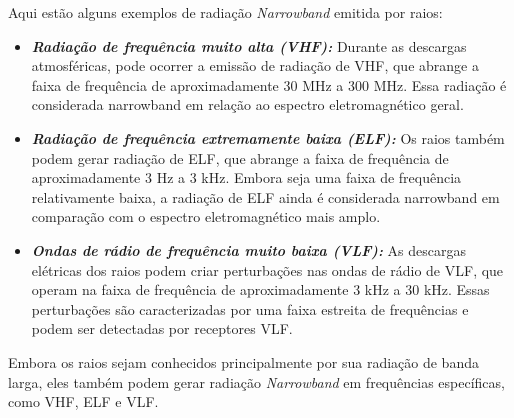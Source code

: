 \documentclass[a4paper, 12pt, onecolumn,singlespacing]{article}
\begin{document}
		Aqui estão alguns exemplos de radiação \textit{Narrowband} emitida por raios:
		\begin{itemize}
			\item \textbf{\textit{Radiação de frequência muito alta (VHF):}} Durante as descargas atmosféricas, pode ocorrer a emissão de radiação de VHF, que abrange a faixa de frequência de aproximadamente 30 MHz a 300 MHz. Essa radiação é considerada narrowband em relação ao espectro eletromagnético geral.
			
			\item \textbf{\textit{Radiação de frequência extremamente baixa (ELF):}} Os raios também podem gerar radiação de ELF, que abrange a faixa de frequência de aproximadamente 3 Hz a 3 kHz. Embora seja uma faixa de frequência relativamente baixa, a radiação de ELF ainda é considerada narrowband em comparação com o espectro eletromagnético mais amplo.
			
			\item \textbf{\textit{Ondas de rádio de frequência muito baixa (VLF):}} As descargas elétricas dos raios podem criar perturbações nas ondas de rádio de VLF, que operam na faixa de frequência de aproximadamente 3 kHz a 30 kHz. Essas perturbações são caracterizadas por uma faixa estreita de frequências e podem ser detectadas por receptores VLF.
			
		\end{itemize}

		Embora os raios sejam conhecidos principalmente por sua radiação de banda larga, eles também podem gerar radiação \textit{Narrowband} em frequências específicas, como VHF, ELF e VLF.
		
\end{document}
